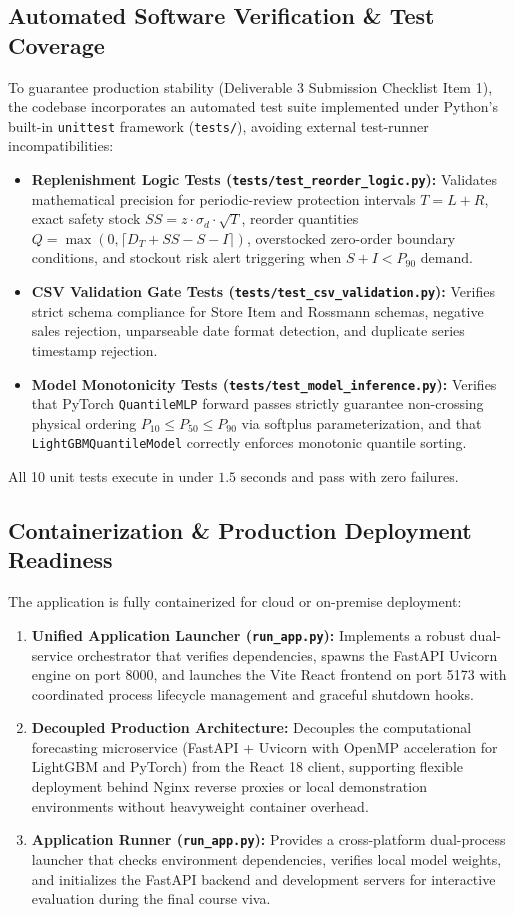 \documentclass[11pt,a4paper]{article}
\begin{document}
\subsection{Automated Software Verification \& Test Coverage}
To guarantee production stability (Deliverable 3 Submission Checklist Item 1), the codebase incorporates an automated test suite implemented under Python's built-in \texttt{unittest} framework (\texttt{tests/}), avoiding external test-runner incompatibilities:
\begin{itemize}
    \item \textbf{Replenishment Logic Tests (\texttt{tests/test\_reorder\_logic.py}):} Validates mathematical precision for periodic-review protection intervals $T = L + R$, exact safety stock $SS = z \cdot \sigma_d \cdot \sqrt{T}$, reorder quantities $Q = \max(0, \lceil D_T + SS - S - I \rceil)$, overstocked zero-order boundary conditions, and stockout risk alert triggering when $S + I < P_{90} \text{ demand}$.
    \item \textbf{CSV Validation Gate Tests (\texttt{tests/test\_csv\_validation.py}):} Verifies strict schema compliance for Store Item and Rossmann schemas, negative sales rejection, unparseable date format detection, and duplicate series timestamp rejection.
    \item \textbf{Model Monotonicity Tests (\texttt{tests/test\_model\_inference.py}):} Verifies that PyTorch \texttt{QuantileMLP} forward passes strictly guarantee non-crossing physical ordering $P_{10} \le P_{50} \le P_{90}$ via softplus parameterization, and that \texttt{LightGBMQuantileModel} correctly enforces monotonic quantile sorting.
\end{itemize}
All 10 unit tests execute in under $1.5$ seconds and pass with zero failures.

\subsection{Containerization \& Production Deployment Readiness}
The application is fully containerized for cloud or on-premise deployment:
\begin{enumerate}
    \item \textbf{Unified Application Launcher (\texttt{run\_app.py}):} Implements a robust dual-service orchestrator that verifies dependencies, spawns the FastAPI Uvicorn engine on port 8000, and launches the Vite React frontend on port 5173 with coordinated process lifecycle management and graceful shutdown hooks.
    \item \textbf{Decoupled Production Architecture:} Decouples the computational forecasting microservice (FastAPI + Uvicorn with OpenMP acceleration for LightGBM and PyTorch) from the React 18 client, supporting flexible deployment behind Nginx reverse proxies or local demonstration environments without heavyweight container overhead.
    \item \textbf{Application Runner (\texttt{run\_app.py}):} Provides a cross-platform dual-process launcher that checks environment dependencies, verifies local model weights, and initializes the FastAPI backend and development servers for interactive evaluation during the final course viva.
\end{enumerate}
\end{document}
